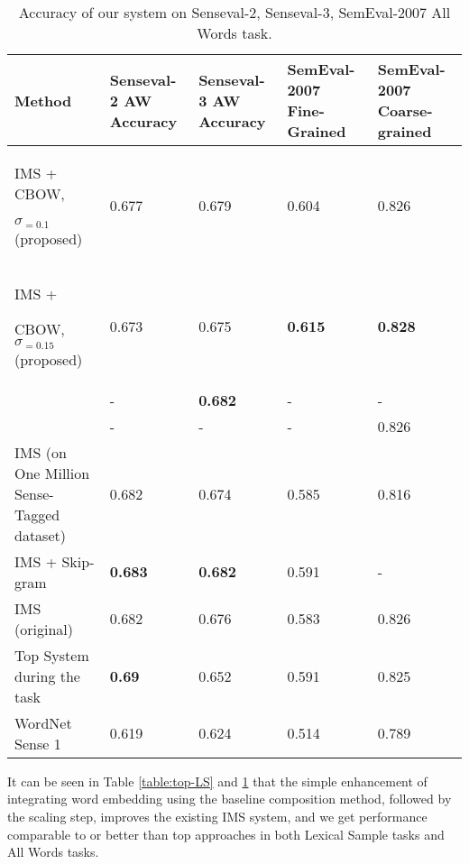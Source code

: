 \begin{table}[th]
	\caption{Accuracy of our system on Senseval-2, Senseval-3, SemEval-2007 All Words task.}
	\label{table:All-AW}
	\begin{center}
		\begin{tabular}{| p{4cm} | p{2cm} | p{3cm} | p{3cm} | p{3cm} | }
			\hline
			Method & Senseval-2 AW Accuracy & Senseval-3 AW Accuracy & SemEval-2007 Fine-Grained & SemEval-2007 Coarse-grained \\
			\hline
			IMS + CBOW, 
			
			$\sigma _{=0.1}$ (proposed) & 0.677 & 0.679 & 0.604 & 0.826  \\
			\hline
            IMS + 
			
			CBOW, $\sigma _{=0.15}$ (proposed) & 0.673 & 0.675 & {\bf0.615} & {\bf 0.828 } \\
			\hline
			
			\cite{Taghipour15} & -& {\bf0.682} & - & - \\
			\hline
			\cite{chen2014} & - & - & - & 0.826  \\
			\hline
			IMS (on One Million Sense-Tagged dataset) & 0.682 & 0.674 & 0.585 & 0.816 \\
            \hline
            IMS + Skip-gram \cite{Iacobacci2016}  & {\bf0.683} & {\bf0.682} & 0.591 & - \\
			\hline
			IMS (original) & 0.682 & 0.676 & 0.583 & 0.826   \\
			\hline
			Top System during the task & {\bf0.69} & 0.652 & 0.591 & 0.825  \\
			\hline
			WordNet Sense 1 & 0.619 & 0.624 & 0.514 & 0.789\\
			\hline
		\end{tabular}
	\end{center}
\end{table}


It can be seen in Table \ref{table:top-LS} and \ref{table:All-AW} that the simple enhancement of integrating word embedding using the baseline composition method, followed by the scaling step, improves the existing IMS system, and we get performance comparable to or better than top approaches in both Lexical Sample tasks and All Words tasks. 

